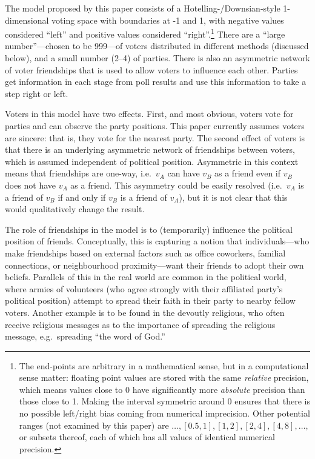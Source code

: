 \documentclass[12pt]{article}
\numberwithin{equation}{subsection}
\begin{document}
The model proposed by this paper consists of a Hotelling-/Downsian-style 1-dimensional voting
space with boundaries at -1 and 1, with negative values considered ``left'' and positive values
considered ``right''.\footnote{The end-points are arbitrary in a
    mathematical sense, but in a computational sense matter: floating point values are stored with
    the same \emph{relative} precision, which means values close to 0 have significantly more
    \emph{absolute} precision than those close to 1.  Making the interval symmetric around 0
    ensures that there is no possible left/right bias coming from numerical imprecision.  Other
    potential ranges (not examined by this paper) are $\hdots, [0.5, 1], [1,2], [2,4], [4,8],
    \hdots$, or subsets thereof, each of which has all values of identical numerical precision.
}  There are a ``large number''---chosen to be 999---of voters distributed in different methods (discussed
below), and a small number (2--4) of parties.  There is also an asymmetric network of voter
friendships that is used to allow voters to influence each other.  Parties get information in each
stage from poll results and use this information to take a step right or left.

Voters in this model have two effects.  First, and most obvious, voters vote for parties and can
observe the party positions.  This paper currently assumes voters are sincere: that is, they vote
for the nearest party.  The second effect of voters is that there is an underlying asymmetric
network of friendships between voters, which is assumed independent of political position.
Asymmetric in this context means that friendships are one-way, i.e.\ $v_A$ can have $v_B$ as a
friend even if $v_B$ does not have $v_A$ as a friend.  This asymmetry could be easily resolved (i.e.\ $v_A$
is a friend of $v_B$ if and only if $v_B$ is a friend of $v_A$), but it is not clear that this would
qualitatively change the result.

The role of friendships in the model is to (temporarily) influence the political position of
friends.  Conceptually, this is capturing a notion that individuals---who make friendships based on
external factors such as office coworkers, familial connections, or neighbourhood proximity---want
their friends to adopt their own beliefs.  Parallels of this in the real world are common in the
political world, where armies of volunteers (who agree strongly with their affiliated party's
political position) attempt to spread their faith in their party to nearby fellow voters.  Another
example is to be found in the devoutly religious, who often receive religious messages as to the
importance of spreading the religious message, e.g.\ spreading ``the word of God.''
\end{document}
